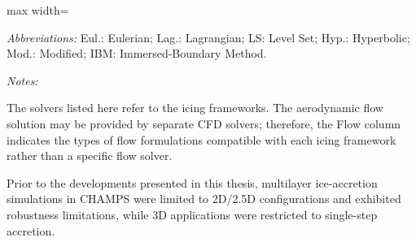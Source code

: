 \begin{table}[ht]
\begin{adjustbox}{max width=\textwidth}
\begin{threeparttable}
\begin{tablenotes}[flushleft]
\item[] \textit{Abbreviations:}
Eul.: Eulerian; Lag.: Lagrangian; LS: Level Set; Hyp.: Hyperbolic; Mod.: Modified; IBM: Immersed-Boundary Method.

\item[] \textit{Notes:}
\item[*] The solvers listed here refer to the icing frameworks. The aerodynamic flow solution may be provided by separate CFD solvers; therefore, the Flow column indicates the types of flow formulations compatible with each icing framework rather than a specific flow solver.
\item[**] Prior to the developments presented in this thesis, multilayer ice-accretion simulations in CHAMPS were limited to 2D/2.5D configurations and exhibited robustness limitations, while 3D applications were restricted to single-step accretion.

\end{tablenotes}

\end{threeparttable}
\end{adjustbox}
\end{table}